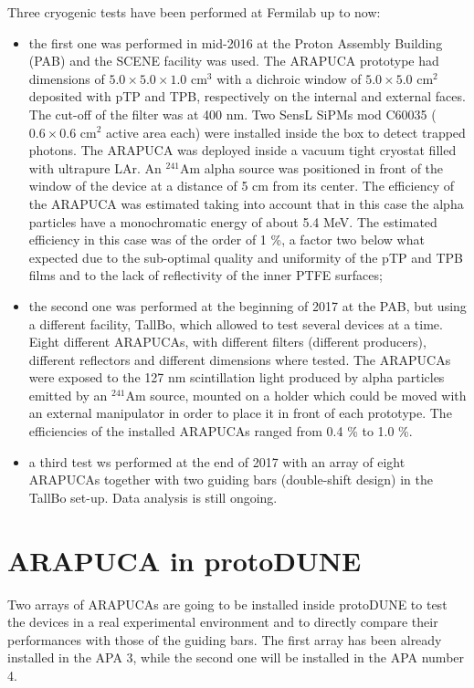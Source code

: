 Three cryogenic tests have been performed at Fermilab up to now:
\begin{itemize}
\item the first one was performed in mid-2016 at the Proton Assembly Building (PAB) and the SCENE facility was used. The ARAPUCA prototype had dimensions of  $5.0 \times 5.0 \times 1.0$ cm$^3$ with a dichroic window of $5.0 \times 5.0$ cm$^2$ deposited with pTP and TPB, respectively on the internal and 
external faces. The cut-off of the filter was at 400 nm. Two SensL SiPMs mod C60035 ($0.6 \times 0.6$ cm$^2$ active area each) were installed inside the box to detect trapped photons. The ARAPUCA was deployed inside a vacuum tight cryostat filled with ultrapure LAr. An $^{241}$Am alpha source was positioned in front of the window of the device at a distance of 5 cm from its center. The efficiency of the ARAPUCA was estimated taking into account that in this case the alpha particles have a  
monochromatic energy of about 5.4 MeV. The estimated efficiency in this case was of the order of 1 \%, a factor two below what expected due to the sub-optimal quality and uniformity of the pTP and TPB films and to the lack of reflectivity of the inner PTFE surfaces;

\item the second one was performed at the beginning of 2017 at the PAB, but using a different facility, 
TallBo, which allowed to test several devices at a time. Eight different ARAPUCAs, with different 
filters (different producers), different reflectors and different dimensions where tested. The ARAPUCAs 
were exposed to the 127 nm scintillation light produced by alpha particles emitted by an $^{241}$Am 
source, mounted on a holder which could be moved with an external manipulator in order to place it in 
front of each prototype. The efficiencies of the installed ARAPUCAs ranged from 0.4 \% to 1.0 \%.

\item a third test ws performed at the end of 2017 with an array of eight ARAPUCAs together with two 
guiding bars (double-shift design) in the TallBo set-up. Data analysis is still ongoing. 

\end{itemize}

\section{ARAPUCA in protoDUNE}

Two arrays of ARAPUCAs are going to be installed inside protoDUNE to test the devices in a real experimental environment and to directly compare their performances with those of the guiding bars. The first array has been already installed in the APA 3, while the second one will be installed in the APA number 4.
 
